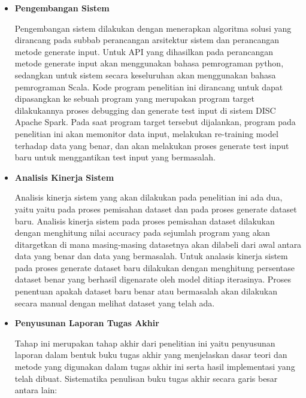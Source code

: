 \begin{itemize}[topsep=0pt]
  \item \textbf{Pengembangan Sistem}
  
  Pengembangan sistem dilakukan dengan menerapkan algoritma 
  solusi yang dirancang pada subbab perancangan arsitektur 
  sistem dan perancangan metode generate input. Untuk API 
  yang dihasilkan pada perancangan metode generate input 
  akan menggunakan bahasa pemrograman python, sedangkan 
  untuk sistem secara keseluruhan akan menggunakan bahasa 
  pemrograman Scala. Kode program penelitian ini dirancang 
  untuk dapat dipasangkan ke sebuah program yang merupakan 
  program target dilakukannya proses debugging dan generate 
  test input di sistem DISC Apache Spark. Pada saat program 
  target tersebut dijalankan, program pada penelitian ini akan 
  memonitor data input, melakukan re-training model terhadap 
  data yang benar, dan akan melakukan proses generate test 
  input baru untuk menggantikan test input yang bermasalah. 

  \item \textbf{Analisis Kinerja Sistem}
  
  Analisis kinerja sistem yang akan dilakukan pada penelitian ini ada dua, yaitu yaitu pada proses pemisahan dataset dan pada proses generate dataset baru. Analisis kinerja sistem pada proses pemisahan dataset dilakukan dengan menghitung nilai accuracy pada sejumlah program yang akan ditargetkan di mana masing-masing datasetnya akan dilabeli dari awal antara data yang benar dan data yang bermasalah. Untuk analasis kinerja sistem pada proses generate dataset baru dilakukan dengan menghitung persentase dataset benar yang berhasil digenarate oleh model ditiap iterasinya. Proses penentuan apakah dataset baru benar atau bermasalah akan dilakukan secara manual dengan melihat dataset yang telah ada.

  \item \textbf{Penyusunan Laporan Tugas Akhir}
  
  Tahap ini merupakan tahap akhir dari penelitian ini yaitu penyusunan laporan dalam bentuk buku tugas akhir yang menjelaskan dasar teori dan metode yang digunakan dalam tugas akhir ini serta hasil implementasi yang telah dibuat. Sistematika penulisan buku tugas akhir secara garis besar antara lain:


\end{itemize}
